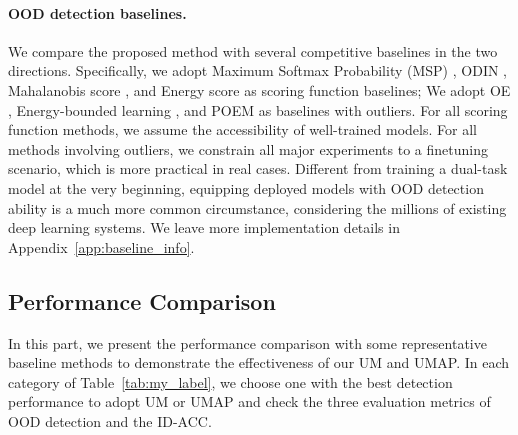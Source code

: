 \documentclass{article}
\theoremstyle{plain}
\theoremstyle{definition}
\theoremstyle{remark}
\begin{document}
\paragraph{OOD detection baselines.} We compare the proposed method with several competitive baselines in the two directions. Specifically, we adopt Maximum Softmax Probability (MSP) \citep{hendrycks17baseline}, ODIN \citep{LiangLS18}, Mahalanobis score \citep{10.5555/3327757.3327819}, and Energy score \citep{liu2020energy} as scoring function baselines; We adopt OE \citep{hendrycks2018deep}, Energy-bounded learning \citep{liu2020energy}, and POEM \citep{ming2022poem} as baselines with outliers. For all scoring function methods, we assume the accessibility of well-trained models. For all methods involving outliers, we constrain all major experiments to a finetuning scenario, which is more practical in real cases. Different from training a dual-task model at the very beginning, equipping deployed models with OOD detection ability is a much more common circumstance, considering the millions of existing deep learning systems. We leave more implementation details in Appendix~\ref{app:baseline_info}.



\subsection{Performance Comparison}
\label{sec:exp_part2}

In this part, we present the performance comparison with some representative baseline methods to demonstrate the effectiveness of our UM and UMAP. 
In each category of Table~\ref{tab:my_label}, we choose one with the best detection performance to adopt UM or UMAP and check the three evaluation metrics of OOD detection and the ID-ACC. 
\end{document}
